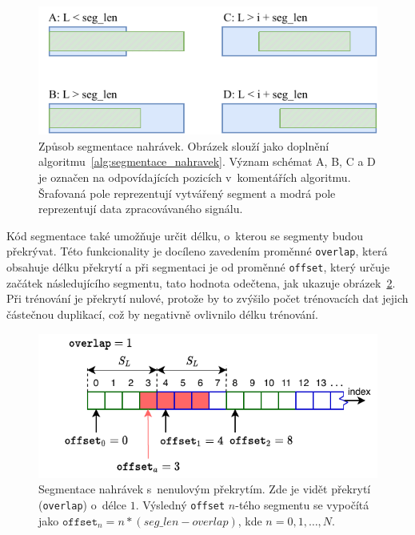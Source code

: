\begin{figure}[H]
    \centering
    \includegraphics[scale=1.0]{obrazky-figures/segmentation.pdf}
    \caption{\label{fig:generovani_segmentu}Způsob segmentace nahrávek. Obrázek slouží jako doplnění algoritmu~\ref{alg:segmentace_nahravek}. Význam schémat A, B, C a D je označen na odpovídajících pozicích v~komentářích algoritmu. Šrafovaná pole reprezentují vytvářený segment a modrá pole reprezentují data zpracovávaného signálu.}
\end{figure}


Kód segmentace také umožňuje určit délku, o~kterou se segmenty budou překrývat. Této funkcionality je docíleno zavedením proměnné \texttt{overlap}, která obsahuje délku překrytí a při segmentaci je od proměnné \texttt{offset}, který určuje začátek následujícího segmentu, tato hodnota odečtena, jak ukazuje obrázek~\ref{fig:segment_overlap}. Při trénování je překrytí nulové, protože by to zvýšilo počet trénovacích dat jejich částečnou duplikací, což by negativně ovlivnilo délku trénování.

\begin{figure}[H]
    \centering
    \includegraphics[scale=1.0]{obrazky-figures/segment_overlap.pdf}
    \caption{\label{fig:segment_overlap}Segmentace nahrávek s~nenulovým překrytím. Zde je vidět překrytí (\texttt{overlap}) o~délce $1$. Výsledný \texttt{offset} $n$-tého segmentu se vypočítá jako $\texttt{offset}_n = n*(seg\_len - overlap)$, kde $n = 0, 1, \dots, N$.}
\end{figure}



